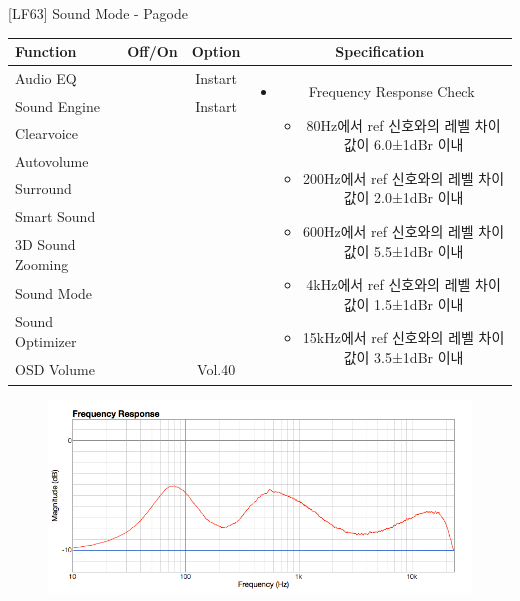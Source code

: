 \begin{frame}[t]{[LF63] Sound Mode - Pagode}
\begin{tiny}
\begin{tabular}{@{}lccc@{}}
\toprule
Function & Off/On & Option & Specification \\
\midrule
Audio EQ & \color{black}{Off} & Instart &
\multirow{10}{60mm}{
\begin{itemize}
\item Frequency Response Check
	\begin{itemize}
	\item 80Hz에서 ref 신호와의 레벨 차이값이 6.0±1dBr 이내
	\item 200Hz에서 ref 신호와의 레벨 차이값이 2.0±1dBr 이내
	\item 600Hz에서 ref 신호와의 레벨 차이값이 5.5±1dBr 이내
	\item 4kHz에서 ref 신호와의 레벨 차이값이 1.5±1dBr 이내
	\item 15kHz에서 ref 신호와의 레벨 차이값이 3.5±1dBr 이내
	\end{itemize}
\end{itemize}
} \\
Sound Engine & \color{blue}{On} & Instart & \\
Clearvoice & \color{black}{Off} & & \\
Autovolume & \color{black}{Off} & & \\
Surround & \color{black}{Off} & & \\
Smart Sound & \color{black}{Off} & & \\
3D Sound Zooming & \color{black}{Off} & & \\
Sound Mode & \color{blue}{On} & \color{blue}{Pagode} & \\
Sound Optimizer & \color{black}{Off} & & \\
OSD Volume & \color{blue}{On} & Vol.40 & \\
\midrule
\end{tabular}
\end{tiny}

\begin{figure}[b]
\includegraphics[height=0.4\textwidth]{figures/pagode.png}
\end{figure}

\end{frame}
